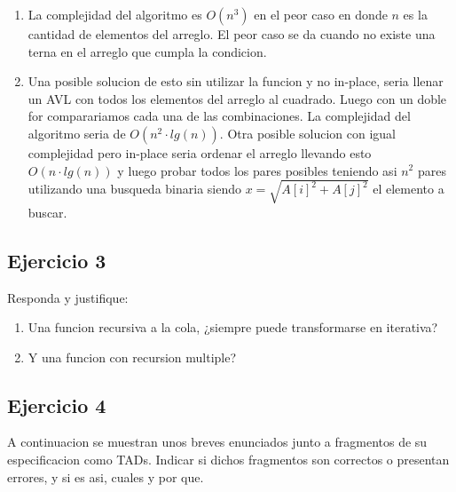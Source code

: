 \documentclass[10pt, a4paper]{report}
\begin{document}
\begin{enumerate}
 \item La complejidad del algoritmo es $O(n^3)$ en el peor caso en donde $n$ es la cantidad de elementos del arreglo. El peor caso se da cuando no existe una terna en el arreglo que cumpla la condicion.
 \item Una posible solucion de esto sin utilizar la funcion y no in-place, seria llenar un AVL con todos los elementos del arreglo al cuadrado. Luego con un doble for comparariamos cada una de las combinaciones. La complejidad del algoritmo seria de $O(n^2 \cdot lg(n))$. Otra posible solucion con igual complejidad pero in-place seria ordenar el arreglo llevando esto $O(n \cdot lg(n))$ y luego probar todos los pares posibles teniendo asi $n^2$ pares utilizando una busqueda binaria siendo $x = \sqrt{A[i]^2+A[j]^2}$ el elemento a buscar.
\end{enumerate}



\subsection*{Ejercicio 3}
Responda y justifique:
\begin{enumerate}
 \item Una funcion recursiva a la cola, ¿siempre puede transformarse en iterativa?
 \item Y una funcion con recursion multiple?
\end{enumerate}


\subsection*{Ejercicio 4} 
A continuacion se muestran unos breves enunciados junto a fragmentos de su especificacion como TADs. Indicar si dichos fragmentos son correctos o presentan errores, y si es asi, cuales y por que.
\end{document}
